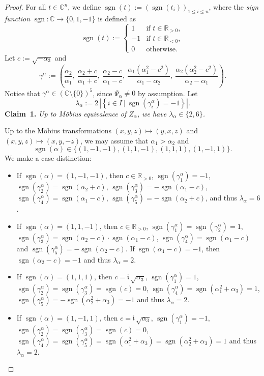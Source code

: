 \documentclass[11pt]{article}
\newenvironment{Mlist}{\begin{itemize}[topsep=0pt,itemsep=4pt,leftmargin=7mm]}{\end{itemize}}
\newcommand{\C}{\mathbb{C}}
\newcommand{\R}{\mathbb{R}}
\newcommand{\ii}{\mathfrak{i}}
\renewcommand{\c}{\colon}
\newcommand{\set}[2]{\left\{#1 ~|~ #2\right\}}
\newcommand{\df}{\emph}
\newcommand{\sgn}{\operatorname{sgn}}
\begin{document}
\begin{proof}
For all $t\in \C^n$, we define $\sgn(t):=(\sgn(t_i))_{1\leq i\leq n}$,
where the \df{sign function} $\sgn\c \C\to \{0,1,-1\}$ is defined as
\[
\sgn(t):=
\begin{cases}
 1 & \text{if }t\in\R_{>0}, \\
-1 & \text{if }t\in\R_{<0}, \\
 0 & \text{otherwise}.
\end{cases}
\]
Let $c:=\sqrt{-\alpha_3}$
and
\[
\gamma^\alpha:=\left(
\frac{\alpha_2}{\alpha_1},~
\frac{\alpha_2+c}{\alpha_1+c},~
\frac{\alpha_2-c}{\alpha_1-c},~
\frac{\alpha_1(\alpha_1^2-c^2)}{\alpha_1-\alpha_2},~
\frac{\alpha_2(\alpha_2^2-c^2)}{\alpha_2-\alpha_1}\right).
\]
Notice that $\gamma^\alpha\in(\C\setminus\{0\})^5$, since $\Psi_\alpha\neq 0$ by assumption.
Let
\[
\lambda_\alpha:=2\,|\set{i\in I}{\sgn(\gamma_i^\alpha)=-1}|.
\]
{\bf Claim~1.} {\it Up to M\"obius equivalence of $Z_\alpha$, we have $\lambda_\alpha\in\{2,6\}$.}

Up to the M\"obius transformations $(x,y,z)\mapsto (y,x,z)$ and $(x,y,z)\mapsto (x,y,-z)$,
we may assume that $\alpha_1>\alpha_2$ and
\[
\sgn(\alpha)\in\{(1,-1,-1),(1,1,-1),(1,1,1),(1,-1,1)\}.
\]
We make a case distinction:
\begin{Mlist}
\item
If $\sgn(\alpha)=(1,-1,-1)$, then
$c\in\R_{>0}$,
$\sgn(\gamma^\alpha_1)=-1$,
$\sgn(\gamma^\alpha_2)= \sgn(\alpha_2+c)$,
$\sgn(\gamma^\alpha_3)=-\sgn(\alpha_1-c)$,
$\sgn(\gamma^\alpha_4)= \sgn(\alpha_1-c)$,
$\sgn(\gamma^\alpha_5)=-\sgn(\alpha_2+c)$,
and thus $\lambda_\alpha=6$.

\item
If $\sgn(\alpha)=(1,1,-1)$, then
$c\in\R_{>0}$,
$\sgn(\gamma^\alpha_1)=
 \sgn(\gamma^\alpha_2)=1$,
$\sgn(\gamma^\alpha_3)= \sgn(\alpha_2-c)\cdot\sgn(\alpha_1-c)$,
$\sgn(\gamma^\alpha_4)= \sgn(\alpha_1-c)$ and
$\sgn(\gamma^\alpha_5)=-\sgn(\alpha_2-c)$.
If $\sgn(\alpha_1-c)=-1$, then $\sgn(\alpha_2-c)=-1$
and thus $\lambda_\alpha=2$.

\item
If $\sgn(\alpha)=(1,1,1)$,
then
$c=\ii\,\sqrt{\alpha_3}$,
$\sgn(\gamma^\alpha_1)=1$,
$\sgn(\gamma^\alpha_2)=\sgn(\gamma^\alpha_3)=\sgn(c)=0$,
$\sgn(\gamma^\alpha_4)=\sgn(\alpha_1^2+\alpha_3)=1$,
$\sgn(\gamma^\alpha_5)=-\sgn(\alpha_2^2+\alpha_3)=-1$
and thus $\lambda_\alpha=2$.

\item
If $\sgn(\alpha)=(1,-1,1)$,
then
$c=\ii\,\sqrt{\alpha_3}$,
$\sgn(\gamma^\alpha_1)=-1$,
$\sgn(\gamma^\alpha_2)=\sgn(\gamma^\alpha_3)=\sgn(c)=0$,
$\sgn(\gamma^\alpha_4)=\sgn(\gamma^\alpha_5)=
\sgn(\alpha_1^2+\alpha_3)=\sgn(\alpha_2^2+\alpha_3)=1$
and thus $\lambda_\alpha=2$.


\end{Mlist}
\end{proof}
\end{document}
